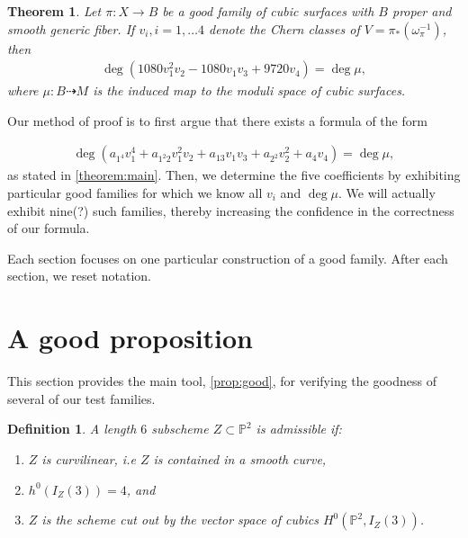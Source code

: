 \documentclass[12 pt]{amsart}
\newtheorem{theorem}{Theorem}[section]
\newtheorem{definition}{Definition}[section]
\renewcommand{\P}{\mathbb{P}}
\newcommand{\<}{\left\langle}
\renewcommand{\>}{\right\rangle}
\begin{document}
\begin{theorem}\label{theorem:main}
  Let $\pi: X \to B$ be a good family of cubic surfaces with $B$
  proper and smooth generic fiber. If $v_{i}, i=1, \dots 4$ denote the
  Chern classes of $V = \pi_{*}(\omega_{\pi}^{-1})$, then
  \begin{align}
    \label{eq:MAIN}
   \deg( 1080v_{1}^{2}v_{2} - 1080v_{1}v_{3}+9720v_{4}) = \deg \mu,
  \end{align}
  where $\mu: B \dashrightarrow M$ is the induced map to the moduli
  space of cubic surfaces.
\end{theorem}


Our method of proof is to first argue that there exists a formula of
the form

\begin{align}
  \label{eq:P}
  \deg (a_{1^4}v_{1}^{4} + a_{1^{2}2}v_{1}^{2}v_{2} + a_{13}v_{1}v_{3} + a_{2^2}v_{2}^{2} + a_{4}v_{4}) = \deg \mu,
\end{align}
as stated in \autoref{theorem:main}.  Then, we determine the five
coefficients by exhibiting particular good families for which we know
all $v_{i}$ and $\deg \mu$.  We will actually exhibit nine(?) such
families, thereby increasing the confidence in the correctness of our
formula.

Each section focuses on one particular construction of a good
family.  After each section, we reset
notation.




\section{A good proposition}
\label{sec:good}

This section provides the main tool, \autoref{prop:good}, for
verifying the goodness of several of our test families.

\begin{definition}
  \label{def:admissible} A length $6$ subscheme $Z \subset \P^{2}$ is
  {\sl admissible} if:
  \begin{enumerate}
  \item $Z$ is curvilinear, i.e $Z$ is contained in a smooth curve,
  \item $h^{0}(I_Z(3)) = 4$, and
  \item $Z$ is the scheme cut out by the vector space of cubics
    $H^0(\P^2, I_Z(3))$.
  \end{enumerate}
\end{definition}
\end{document}
